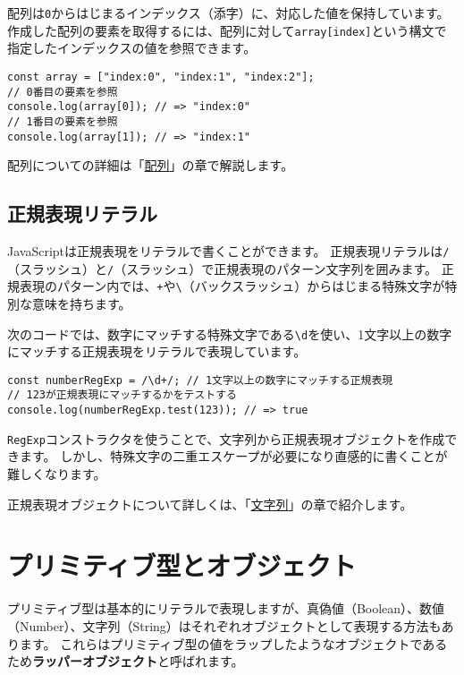 配列は\texttt{0}からはじまるインデックス（添字）に、対応した値を保持しています。
作成した配列の要素を取得するには、配列に対して\texttt{array[index]}という構文で指定したインデックスの値を参照できます。

\begin{lstlisting}
const array = ["index:0", "index:1", "index:2"];
// 0番目の要素を参照
console.log(array[0]); // => "index:0"
// 1番目の要素を参照
console.log(array[1]); // => "index:1"
\end{lstlisting}

配列についての詳細は「\hyperlink{array}{配列}」の章で解説します。

\hypertarget{regexp-literal}{%
\subsection{正規表現リテラル}\label{regexp-literal}}

JavaScriptは正規表現をリテラルで書くことができます。
正規表現リテラルは\texttt{/}（スラッシュ）と\texttt{/}（スラッシュ）で正規表現のパターン文字列を囲みます。
正規表現のパターン内では、\texttt{+}や\texttt{\textbackslash}（バックスラッシュ）からはじまる特殊文字が特別な意味を持ちます。

次のコードでは、数字にマッチする特殊文字である\texttt{\textbackslash d}を使い、1文字以上の数字にマッチする正規表現をリテラルで表現しています。

\begin{lstlisting}
const numberRegExp = /\d+/; // 1文字以上の数字にマッチする正規表現
// 123が正規表現にマッチするかをテストする
console.log(numberRegExp.test(123)); // => true
\end{lstlisting}

\texttt{RegExp}コンストラクタを使うことで、文字列から正規表現オブジェクトを作成できます。
しかし、特殊文字の二重エスケープが必要になり直感的に書くことが難しくなります。

正規表現オブジェクトについて詳しくは、「\hyperlink{string}{文字列}」の章で紹介します。

\hypertarget{primitive-and-wrapper-object}{%
\section{プリミティブ型とオブジェクト}\label{primitive-and-wrapper-object}}

プリミティブ型は基本的にリテラルで表現しますが、真偽値（Boolean）、数値（Number）、文字列（String）はそれぞれオブジェクトとして表現する方法もあります。
これらはプリミティブ型の値をラップしたようなオブジェクトであるため\textbf{ラッパーオブジェクト}と呼ばれます。

